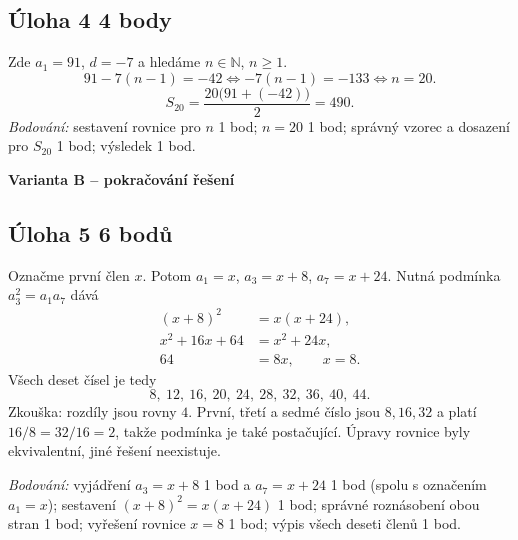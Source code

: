 \documentclass[a4paper,11pt]{article}
\begin{document}
\subsection*{Úloha 4 \hfill 4 body}
Zde $a_1=91$, $d=-7$ a hledáme $n\in\mathbb N$, $n\ge1$.
\[
    91-7(n-1)=-42 \iff -7(n-1)=-133 \iff n=20.
\]
\[
    S_{20}=\frac{20\bigl(91+(-42)\bigr)}2=490.
\]
\textit{Bodování:} sestavení rovnice pro $n$ 1 bod; $n=20$ 1 bod;
správný vzorec a dosazení pro $S_{20}$ 1 bod; výsledek 1 bod.

\newpage
\begin{center}
    {\large\bfseries Varianta B -- pokračování řešení}
\end{center}

\subsection*{Úloha 5 \hfill 6 bodů}
Označme první člen $x$. Potom $a_1=x$, $a_3=x+8$, $a_7=x+24$.
Nutná podmínka $a_3^2=a_1a_7$ dává
\begin{align*}
    (x+8)^2&=x(x+24),\\
    x^2+16x+64&=x^2+24x,\\
    64&=8x,\qquad x=8.
\end{align*}
Všech deset čísel je tedy
\[
    8,\ 12,\ 16,\ 20,\ 24,\ 28,\ 32,\ 36,\ 40,\ 44.
\]
Zkouška: rozdíly jsou rovny $4$. První, třetí a sedmé číslo jsou $8,16,32$
a platí $16/8=32/16=2$, takže podmínka je také postačující.
Úpravy rovnice byly ekvivalentní, jiné řešení neexistuje.

\textit{Bodování:} vyjádření $a_3=x+8$ 1 bod a $a_7=x+24$ 1 bod
(spolu s označením $a_1=x$); sestavení $(x+8)^2=x(x+24)$ 1 bod;
správné roznásobení obou stran 1 bod; vyřešení rovnice $x=8$ 1 bod;
výpis všech deseti členů 1 bod.
\end{document}
